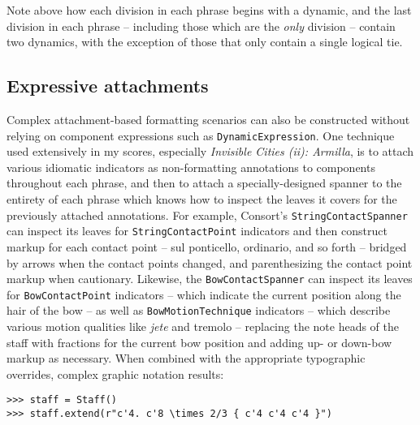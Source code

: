 \noindent Note above how each division in each phrase begins with a dynamic,
and the last division in each phrase -- including those which are the
\emph{only} division -- contain two dynamics, with the exception of those that
only contain a single logical tie.

\subsection{Expressive attachments}
\label{ssec:expressive-attachments}

\noindent Complex attachment-based formatting scenarios can also be constructed
without relying on component expressions such as \texttt{DynamicExpression}.
One technique used extensively in my scores, especially \emph{Invisible Cities
(ii): Armilla}, is to attach various idiomatic indicators as non-formatting
annotations to components throughout each phrase, and then to attach a
specially-designed spanner to the entirety of each phrase which knows how to
inspect the leaves it covers for the previously attached annotations. For
example, Consort's \texttt{StringContactSpanner} can inspect its leaves for
\texttt{StringContactPoint} indicators and then construct markup for each
contact point -- sul ponticello, ordinario, and so forth -- bridged by arrows
when the contact points changed, and parenthesizing the contact point markup
when cautionary. Likewise, the \texttt{BowContactSpanner} can inspect its
leaves for \texttt{BowContactPoint} indicators -- which indicate the current
position along the hair of the bow -- as well as \texttt{BowMotionTechnique}
indicators -- which describe various motion qualities like \emph{jete} and
tremolo -- replacing the note heads of the staff with fractions for the current
bow position and adding up- or down-bow markup as necessary. When combined with
the appropriate typographic overrides, complex graphic notation results:

\begin{comment}
<abjad>
staff = Staff()
staff.extend(r"c'4. c'8 \times 2/3 { c'4 c'4 c'4 }")
</abjad>
\end{comment}

\begin{abjadbookoutput}
\begin{singlespacing}
\vspace{-0.5\baselineskip}
\begin{lstlisting}
>>> staff = Staff()
>>> staff.extend(r"c'4. c'8 \times 2/3 { c'4 c'4 c'4 }")
\end{lstlisting}
\end{singlespacing}
\end{abjadbookoutput}

